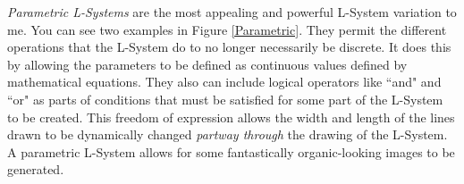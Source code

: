\documentclass[12pt,twoside]{reedthesis}
\begin{document}
	
	\textit{Parametric L-Systems} are the most appealing and powerful L-System variation to me. You can see two examples in Figure \ref{Parametric}. They permit the different operations that the L-System do to no longer necessarily be discrete. It does this by allowing the parameters to be defined as continuous values defined by mathematical equations. They also can include logical operators like ``and" and ``or" as parts of conditions that must be satisfied for some part of the L-System to be created. This freedom of expression allows the width and length of the lines drawn to be dynamically changed \textit{partway through} the drawing of the L-System. A parametric L-System allows for some fantastically organic-looking images to be generated.
	
\end{document}
